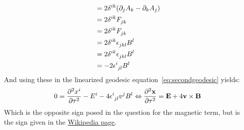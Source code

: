 \documentclass[12pt,a4]{article}
\begin{document}
\begin{enumerate}
\begin{enumerate}
\begin{align*}
                               &= 2 \delta^{i k} (\partial_j A_k - \partial_k A_j) \\
                               &= 2 \delta^{i k} \tensor{F}{_j_k}\\
                               &= 2 \delta^{i k} \tensor{F}{_j_k}\\
                               &= 2 \delta^{i k} \tensor{\epsilon}{_j_k_l}B^l\\
                               &= 2 \delta^{i k} \tensor{\epsilon}{_j_k_l}B^l\\
                               &= - 2 \tensor{\epsilon}{^i_j_l}B^l
        \end{align*}
        And using these in the linearized geodesic equation~\ref{eq:secondgeodesic} yields:
        \begin{align*}
          0 = \frac{\partial^2 x^i}{\partial \tau^2} - E^i - 4\tensor{\epsilon}{^i_j_l}v^j B^l  \Leftrightarrow \frac{\partial^2 \mathbf{x}}{\partial \tau^2} = \mathbf{E} + 4\mathbf{v} \times \mathbf{B}
        \end{align*}
        Which is the opposite sign posed in the question for the magnetic term, but is the sign given in the \href{https://en.wikipedia.org/wiki/Gravitoelectromagnetism}{Wikipedia page}.
    \end{enumerate}
\end{enumerate}
\end{document}
